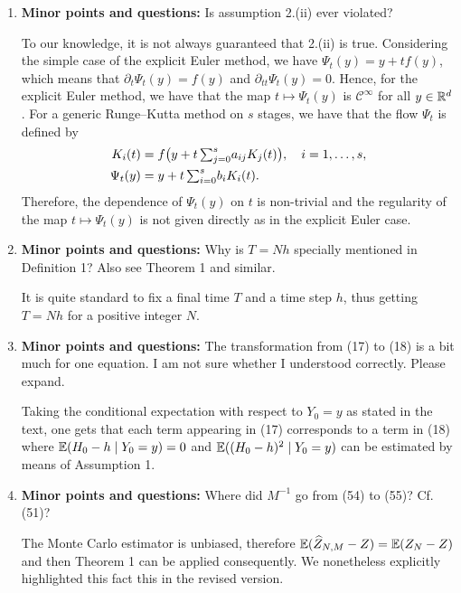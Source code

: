 \documentclass[10pt]{article}
\begin{document}
\begin{enumerate}
	\item 
	\begin{itquote}
		\textbf{Minor points and questions:} Is assumption 2.(ii) ever violated?
	\end{itquote}
	To our knowledge, it is not always guaranteed that 2.(ii) is true. Considering the simple case of the explicit Euler method, we have $\Psi_t(y) = y + tf(y)$, which means that $\partial_t \Psi_t(y) = f(y)$ and $\partial_{tt} \Psi_t(y) = 0$. Hence, for the explicit Euler method, we have that the map $t \mapsto \Psi_t(y)$ is $\mathcal C^{\infty}$ for all $y \in \mathbb{R}^d$. For a generic Runge--Kutta method on $s$ stages, we have that the flow $\Psi_t$ is defined by
	\begin{equation*}
	\begin{aligned}
		K_i(t) &= f\big(y + t\, {\textstyle\sum}_{j=0}^s a_{ij}K_j(t)\big), \quad i = 1, \ldots, s, \\
		\Psi_t(y) &= y + t \,{\textstyle\sum}_{i=0}^s b_i K_i(t).
	\end{aligned}
	\end{equation*}
	Therefore, the dependence of $\Psi_t(y)$ on $t$ is non-trivial and the regularity of the map $t \mapsto \Psi_t(y)$ is not given directly as in the explicit Euler case.
	\item 
	\begin{itquote}
		\textbf{Minor points and questions:} Why is $T = Nh$ specially mentioned in Definition 1? Also see Theorem 1 and similar.
	\end{itquote}
	It is quite standard to fix a final time $T$ and a time step $h$, thus getting $T = Nh$ for a positive integer $N$. 
	\item 
	\begin{itquote}
		\textbf{Minor points and questions:} The transformation from (17) to (18) is a bit much for one equation. I am not sure whether I understood correctly. Please expand.
	\end{itquote}
	Taking the conditional expectation with respect to $Y_0 = y$ as stated in the text, one gets that each term appearing in (17) corresponds to a term in (18) where $\operatorname{\mathbb{E}}(H_0 - h \mid Y_0 = y) = 0$ and $\operatorname{\mathbb{E}}((H_0 - h)^2 \mid Y_0 = y)$ can be estimated by means of Assumption 1.
	\item
	\begin{itquote}
		\textbf{Minor points and questions:} Where did $M^{-1}$ go from (54) to (55)? Cf. (51)?
	\end{itquote}
	The Monte Carlo estimator is unbiased, therefore $\operatorname{\mathbb{E}}(\widehat Z_{N,M} - Z) = \operatorname{\mathbb{E}}(Z_N - Z)$ and then Theorem 1 can be applied consequently. We nonetheless explicitly highlighted this fact this in the revised version.

\end{enumerate}
\end{document}

